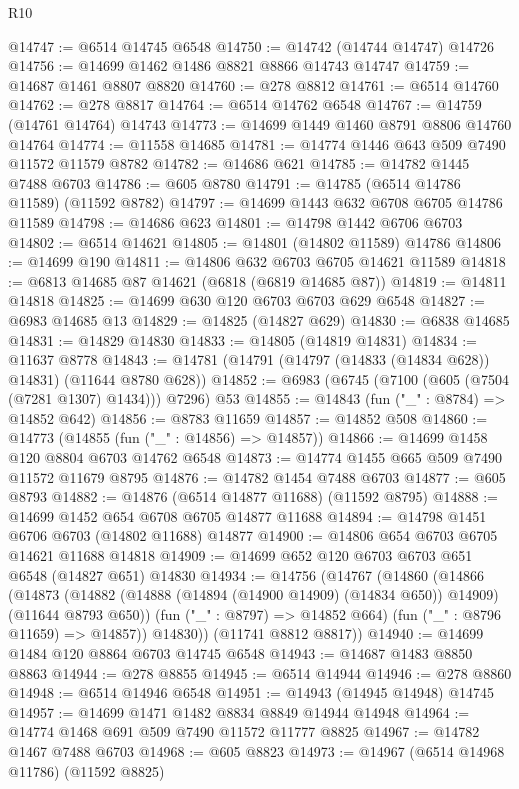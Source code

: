 \begin{lexlean}{R10}
\begin{coremodule}
@14747 := @6514 @14745 @6548
@14750 := @14742 (@14744 @14747) @14726
@14756 := @14699 @1462 @1486 @8821 @8866 @14743 @14747
@14759 := @14687 @1461 @8807 @8820
@14760 := @278 @8812
@14761 := @6514 @14760
@14762 := @278 @8817
@14764 := @6514 @14762 @6548
@14767 := @14759 (@14761 @14764) @14743
@14773 := @14699 @1449 @1460 @8791 @8806 @14760 @14764
@14774 := @11558 @14685
@14781 := @14774 @1446 @643 @509 @7490 @11572 @11579 @8782
@14782 := @14686 @621
@14785 := @14782 @1445 @7488 @6703
@14786 := @605 @8780
@14791 := @14785 (@6514 @14786 @11589) (@11592 @8782)
@14797 := @14699 @1443 @632 @6708 @6705 @14786 @11589
@14798 := @14686 @623
@14801 := @14798 @1442 @6706 @6703
@14802 := @6514 @14621
@14805 := @14801 (@14802 @11589) @14786
@14806 := @14699 @190
@14811 := @14806 @632 @6703 @6705 @14621 @11589
@14818 := @6813 @14685 @87 @14621 (@6818 (@6819 @14685 @87))
@14819 := @14811 @14818
@14825 := @14699 @630 @120 @6703 @6703 @629 @6548
@14827 := @6983 @14685 @13
@14829 := @14825 (@14827 @629)
@14830 := @6838 @14685
@14831 := @14829 @14830
@14833 := @14805 (@14819 @14831)
@14834 := @11637 @8778
@14843 := @14781 (@14791 (@14797 (@14833 (@14834 @628)) @14831) (@11644 @8780 @628))
@14852 := @6983 (@6745 (@7100 (@605 (@7504 (@7281 @1307) @1434))) @7296) @53
@14855 := @14843 (fun ("_" : @8784) => @14852 @642)
@14856 := @8783 @11659
@14857 := @14852 @508
@14860 := @14773 (@14855 (fun ("_" : @14856) => @14857))
@14866 := @14699 @1458 @120 @8804 @6703 @14762 @6548
@14873 := @14774 @1455 @665 @509 @7490 @11572 @11679 @8795
@14876 := @14782 @1454 @7488 @6703
@14877 := @605 @8793
@14882 := @14876 (@6514 @14877 @11688) (@11592 @8795)
@14888 := @14699 @1452 @654 @6708 @6705 @14877 @11688
@14894 := @14798 @1451 @6706 @6703 (@14802 @11688) @14877
@14900 := @14806 @654 @6703 @6705 @14621 @11688 @14818
@14909 := @14699 @652 @120 @6703 @6703 @651 @6548 (@14827 @651) @14830
@14934 := @14756
    (@14767
      (@14860
        (@14866
          (@14873
            (@14882 (@14888 (@14894 (@14900 @14909) (@14834 @650)) @14909) (@11644 @8793 @650))
            (fun ("_" : @8797) => @14852 @664)
            (fun ("_" : @8796 @11659) => @14857))
          @14830))
      (@11741 @8812 @8817))
@14940 := @14699 @1484 @120 @8864 @6703 @14745 @6548
@14943 := @14687 @1483 @8850 @8863
@14944 := @278 @8855
@14945 := @6514 @14944
@14946 := @278 @8860
@14948 := @6514 @14946 @6548
@14951 := @14943 (@14945 @14948) @14745
@14957 := @14699 @1471 @1482 @8834 @8849 @14944 @14948
@14964 := @14774 @1468 @691 @509 @7490 @11572 @11777 @8825
@14967 := @14782 @1467 @7488 @6703
@14968 := @605 @8823
@14973 := @14967 (@6514 @14968 @11786) (@11592 @8825)

\end{coremodule}
\end{lexlean}
